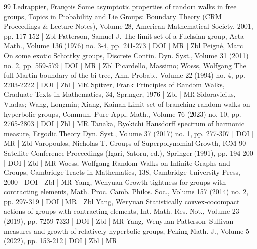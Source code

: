 \documentclass[10pt]{amsart}
\theoremstyle{definition}\newtheorem{defi}[theo]{Definition}\newtheorem{rema}[theo]{Remark}\newtheorem{exam}[theo]{Example}\newtheorem{exem}[theo]{Example}\newtheorem{nota}[theo]{Notation}
\begin{document}
\begin{thebibliography}{99}
 Ledrappier, François Some asymptotic properties of random walks in free groups, Topics in Probability and Lie Groups: Boundary Theory (CRM Proceedings \& Lecture Notes), Volume 28, American Mathematical Society, 2001, pp. 117-152 | Zbl
 Patterson, Samuel J. The limit set of a Fuchsian group, Acta Math., Volume 136 (1976) no. 3-4, pp. 241-273 | DOI | MR | Zbl
 Peigné, Marc On some exotic Schottky groups, Discrete Contin. Dyn. Syst., Volume 31 (2011) no. 2, pp. 559-579 | DOI | MR | Zbl
 Picardello, Massimo; Woess, Wolfgang The full Martin boundary of the bi-tree, Ann. Probab., Volume 22 (1994) no. 4, pp. 2203-2222 | DOI | Zbl | MR
 Spitzer, Frank Principles of Random Walks, Graduate Texts in Mathematics, 34, Springer, 1976 | Zbl | MR
 Sidoravicius, Vladas; Wang, Longmin; Xiang, Kainan Limit set of branching random walks on hyperbolic groups, Commun. Pure Appl. Math., Volume 76 (2023) no. 10, pp. 2765-2803 | DOI | Zbl | MR
 Tanaka, Ryokichi Hausdorff spectrum of harmonic measure, Ergodic Theory Dyn. Syst., Volume 37 (2017) no. 1, pp. 277-307 | DOI | MR | Zbl
 Varopoulos, Nicholas T. Groups of Superpolynomial Growth, ICM-90 Satellite Conference Proceedings (Igari, Satoru, ed.), Springer (1991), pp. 194-200 | DOI | Zbl | MR
 Woess, Wolfgang Random Walks on Infinite Graphs and Groups, Cambridge Tracts in Mathematics, 138, Cambridge University Press, 2000 | DOI | Zbl | MR
 Yang, Wenyuan Growth tightness for groups with contracting elements, Math. Proc. Camb. Philos. Soc., Volume 157 (2014) no. 2, pp. 297-319 | DOI | MR | Zbl
 Yang, Wenyuan Statistically convex-cocompact actions of groups with contracting elements, Int. Math. Res. Not., Volume 23 (2019), pp. 7259-7323 | DOI | Zbl | MR
 Yang, Wenyuan Patterson–Sullivan measures and growth of relatively hyperbolic groups, Peking Math. J., Volume 5 (2022), pp. 153-212 | DOI | Zbl | MR
\end{thebibliography}
\end{document}
